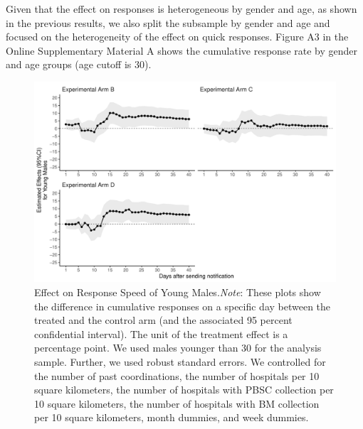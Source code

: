 \documentclass[12pt, a4paper]{article}
\begin{document}
Given that the effect on responses is heterogeneous by gender and age, as shown in the previous results, we also split the subsample by gender and age and focused on the heterogeneity of the effect on quick responses. Figure A3 in the Online Supplementary Material A shows the cumulative response rate by gender and age groups (age cutoff is 30).

\begin{figure}[t]
\includegraphics{JMDP RCT - Main Document_files/figure-latex/young-male-flow-1} \caption{Effect on Response Speed of Young Males.\newline \emph{Note}: These plots show the difference in cumulative responses on a specific day between the treated and the control arm (and the associated 95 percent confidential interval). The unit of the treatment effect is a percentage point. We used males younger than 30 for the analysis sample. Further, we used robust standard errors. We controlled for the number of past coordinations, the number of hospitals per 10 square kilometers, the number of hospitals with PBSC collection per 10 square kilometers, the number of hospitals with BM collection per 10 square kilometers, month dummies, and week dummies.}\label{fig:young-male-flow}
\end{figure}
\end{document}
